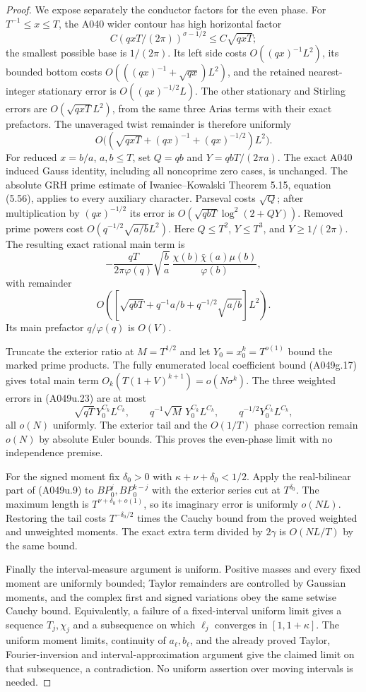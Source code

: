 \begin{proof}
We expose separately the conductor factors for the even
phase. For $T^{-1}\le x\le T$, the A040 wider contour
has high horizontal factor
\[
 C(qxT/(2\pi))^{\sigma-1/2}\le C\sqrt{qxT};
\]
the smallest possible base is $1/(2\pi)$.
Its left side costs $O((qx)^{-1}L^2)$, its bounded
bottom costs $O(((qx)^{-1}+\sqrt{qx})L^2)$, and the
retained nearest-integer stationary error is
$O((qx)^{-1/2}L)$. The other stationary and Stirling
errors are $O(\sqrt{qxT}L^2)$, from the same three
Arias terms with their exact prefactors. The unaveraged
twist remainder is therefore uniformly
\[
 O\bigl((\sqrt{qxT}+(qx)^{-1}+(qx)^{-1/2})L^2\bigr).
\tag{A049u.22}
\]
For reduced $x=b/a$, $a,b\le T$, set $Q=qb$ and
$Y=qbT/(2\pi a)$. The exact A040 induced Gauss identity,
including all noncoprime zero cases, is unchanged.
The absolute GRH prime estimate of Iwaniec--Kowalski
Theorem 5.15, equation (5.56), applies to every auxiliary
character. Parseval costs $\sqrt Q$; after multiplication
by $(qx)^{-1/2}$ its error is
$O(\sqrt{qbT}\log^2(2+QY))$. Removed prime powers cost
$O(q^{-1/2}\sqrt{a/b}L^2)$. Here $Q\le T^2$,
$Y\le T^3$, and $Y\ge1/(2\pi)$.
The resulting exact rational main term is
\[
 -\frac{qT}{2\pi\varphi(q)}\sqrt{\frac ba}\,
       \frac{\chi(b)\bar\chi(a)\mu(b)}{\varphi(b)},
\]
with remainder
\[
 O\left(\left[\sqrt{qbT}+q^{-1}a/b+
                  q^{-1/2}\sqrt{a/b}\right]L^2\right).
\tag{A049u.23}
\]
Its main prefactor $q/\varphi(q)$ is $O(V)$.

Truncate the exterior ratio at $M=T^{1/2}$ and let
$Y_0=x_0^k=T^{o(1)}$ bound the marked prime products.
The fully enumerated local coefficient bound (A049g.17)
gives total main term
$O_k(T(1+V)^{k+1})=o(N\sigma^k)$.
The three weighted errors in (A049u.23) are at most
\[
 \sqrt{qT}\,Y_0^{C_k}L^{C_k},\qquad
 q^{-1}\sqrt M\,Y_0^{C_k}L^{C_k},\qquad
 q^{-1/2}Y_0^{C_k}L^{C_k},
\]
all $o(N)$ uniformly. The exterior tail and the
$O(1/T)$ phase correction remain $o(N)$ by absolute
Euler bounds. This proves the even-phase limit with
no independence premise.

For the signed moment fix $\delta_0>0$ with
$\kappa+\nu+\delta_0<1/2$. Apply the real-bilinear
part of (A049u.9) to $BP_0^j,BP_0^{k-j}$ with the
exterior series cut at $T^{\delta_0}$.
The maximum length is $T^{\nu+\delta_0+o(1)}$, so
its imaginary error is uniformly $o(NL)$.
Restoring the tail costs $T^{-\delta_0/2}$ times the
Cauchy bound from the proved weighted and unweighted
moments. The exact extra term divided by $2\gamma$
is $O(NL/T)$ by the same bound.

Finally the interval-measure argument is uniform.
Positive masses and every fixed moment are uniformly
bounded; Taylor remainders are controlled by Gaussian
moments, and the complex first and signed variations
obey the same setwise Cauchy bound. Equivalently, a
failure of a fixed-interval uniform limit gives a
sequence $T_j,\chi_j$ and a subsequence on which
$\ell_j$ converges in $[1,1+\kappa]$.
The uniform moment limits, continuity of $a_\ell,b_\ell$,
and the already proved Taylor, Fourier-inversion and
interval-approximation argument give the claimed limit
on that subsequence, a contradiction. No uniform
assertion over moving intervals is needed.
\end{proof}

